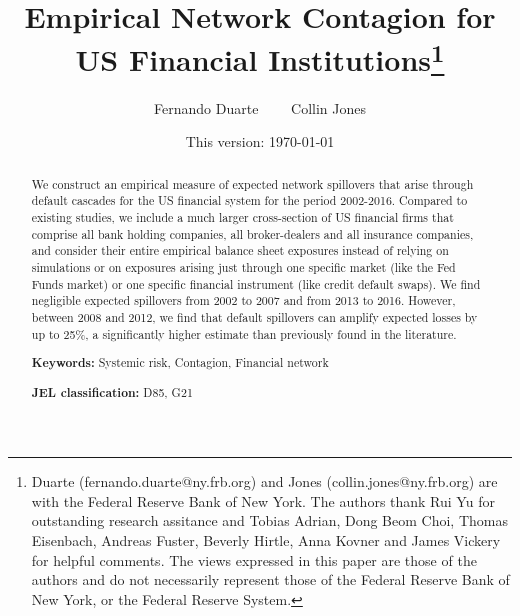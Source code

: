\documentclass[12pt]{article}
\begin{document}
\title{Empirical Network Contagion for US Financial Institutions\thanks{%
Duarte (fernando.duarte@ny.frb.org) and Jones (collin.jones@ny.frb.org) are with the Federal
Reserve Bank of New York. The authors thank Rui Yu for outstanding research assitance and Tobias Adrian, Dong Beom Choi, Thomas Eisenbach, Andreas Fuster, Beverly Hirtle, Anna Kovner and James Vickery for helpful comments. The views expressed in this paper are those of the authors
and do not necessarily represent those of the Federal Reserve Bank of New York, or the Federal Reserve System.}}
\author{Fernando Duarte \ \ \ \ Collin Jones}
\date{{\normalsize {This version: \today}}}
\maketitle

\begin{abstract}
\noindent We construct an empirical measure of expected network spillovers that arise through default cascades for the US financial system for the period 2002-2016. Compared to existing studies, we include a much larger cross-section of US financial firms that comprise all bank holding companies, all broker-dealers and all insurance companies, and consider their entire empirical balance sheet exposures instead of relying on simulations or on exposures arising just through one specific market (like the Fed Funds market) or one specific financial instrument (like credit default swaps). We find negligible expected spillovers from 2002 to 2007 and from 2013 to 2016. However, between 2008 and 2012, we find that default spillovers can amplify expected losses by up to 25\%, a significantly higher estimate than previously found in the literature.
\vspace*{.5cm}

\noindent \textbf{Keywords:} Systemic risk, Contagion, Financial network

\noindent \textbf{JEL classification:} D85, G21\newline
\end{abstract}

\begin{center}
\end{center}

\vspace{0.5cm}

\vspace{0.5cm}


\thispagestyle{empty} \newpage \setcounter{page}{1} \onehalfspacing
\end{document}
